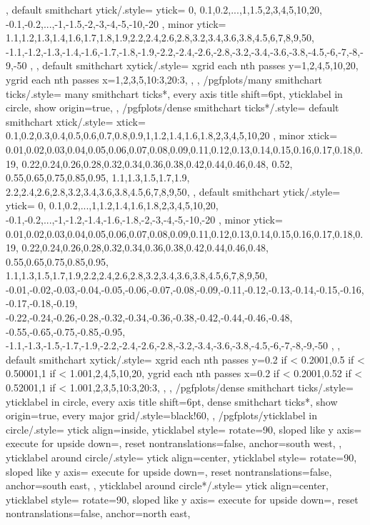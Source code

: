 {{{		},
		default smithchart ytick/.style={
			ytick={%
				0,%
				0.1,0.2,...,1,1.5,2,3,4,5,10,20,%
				-0.1,-0.2,...,-1,-1.5,-2,-3,-4,-5,-10,-20%
			},
			minor ytick={%
				1.1,1.2,1.3,1.4,1.6,1.7,1.8,1.9,2.2,2.4,2.6,2.8,3.2,3.4,3.6,3.8,4.5,6,7,8,9,50,%
				-1.1,-1.2,-1.3,-1.4,-1.6,-1.7,-1.8,-1.9,-2.2,-2.4,-2.6,-2.8,-3.2,-3.4,-3.6,-3.8,-4.5,-6,-7,-8,-9,-50%
			},
		},
		default smithchart xytick/.style={
			xgrid each nth passes y={1,2,4,5,10,20},
			ygrid each nth passes x={1,2,3,5,10:3,20:3},
		},
	},
	/pgfplots/many smithchart ticks/.style={
		many smithchart ticks*,
		every axis title shift=6pt,
		yticklabel in circle,
		show origin=true,
	},
	/pgfplots/dense smithchart ticks*/.style={
		default smithchart xtick/.style={
			xtick={
				0.1,0.2,0.3,0.4,0.5,0.6,0.7,0.8,0.9,1,1.2,1.4,1.6,1.8,2,3,4,5,10,20%
			},
			minor xtick={%
				0.01,0.02,0.03,0.04,0.05,0.06,0.07,0.08,0.09,0.11,0.12,0.13,0.14,0.15,0.16,0.17,0.18,0.19,%
				0.22,0.24,0.26,0.28,0.32,0.34,0.36,0.38,0.42,0.44,0.46,0.48,%
				0.52,%
				0.55,0.65,0.75,0.85,0.95,%
				1.1,1.3,1.5,1.7,1.9,%
				2.2,2.4,2.6,2.8,3.2,3.4,3.6,3.8,4.5,6,7,8,9,50},
		},
		default smithchart ytick/.style={
			ytick={%
				0,%
				0.1,0.2,...,1,1.2,1.4,1.6,1.8,2,3,4,5,10,20,%
				-0.1,-0.2,...,-1,-1.2,-1.4,-1.6,-1.8,-2,-3,-4,-5,-10,-20%
			},
			minor ytick={%
				0.01,0.02,0.03,0.04,0.05,0.06,0.07,0.08,0.09,0.11,0.12,0.13,0.14,0.15,0.16,0.17,0.18,0.19,%
				0.22,0.24,0.26,0.28,0.32,0.34,0.36,0.38,0.42,0.44,0.46,0.48,%
				0.55,0.65,0.75,0.85,0.95,%
				1.1,1.3,1.5,1.7,1.9,2.2,2.4,2.6,2.8,3.2,3.4,3.6,3.8,4.5,6,7,8,9,50,%
				-0.01,-0.02,-0.03,-0.04,-0.05,-0.06,-0.07,-0.08,-0.09,-0.11,-0.12,-0.13,-0.14,-0.15,-0.16,-0.17,-0.18,-0.19,%
				-0.22,-0.24,-0.26,-0.28,-0.32,-0.34,-0.36,-0.38,-0.42,-0.44,-0.46,-0.48,%
				-0.55,-0.65,-0.75,-0.85,-0.95,%
				-1.1,-1.3,-1.5,-1.7,-1.9,-2.2,-2.4,-2.6,-2.8,-3.2,-3.4,-3.6,-3.8,-4.5,-6,-7,-8,-9,-50%
			},
		},
		default smithchart xytick/.style={
			xgrid each nth passes y={0.2 if < 0.2001,0.5 if < 0.50001,1 if < 1.001,2,4,5,10,20},
			ygrid each nth passes x={0.2 if < 0.2001,0.52 if < 0.52001,1 if < 1.001,2,3,5,10:3,20:3},
		},
	},
	/pgfplots/dense smithchart ticks/.style={
		yticklabel in circle,
		every axis title shift=6pt,
		dense smithchart ticks*,
		show origin=true,
		every major grid/.style={black!60},
	},
	/pgfplots/yticklabel in circle/.style={
		ytick align=inside,
		yticklabel style={
			rotate=90,
			sloped like y axis={%
				execute for upside down={\tikzset{anchor=north east}},
				reset nontranslations=false},
			anchor=south west,
		}
	},
	yticklabel around circle/.style={
		ytick align=center,
		yticklabel style={
			rotate=90,
			sloped like y axis={%
				execute for upside down={\tikzset{anchor=south west}},
				reset nontranslations=false},
			anchor=south east,
		}
	},
	yticklabel around circle*/.style={
		ytick align=center,
		yticklabel style={
			rotate=90,
			sloped like y axis={%
				execute for upside down={\tikzset{anchor=north west}},
				reset nontranslations=false},
			anchor=north east,
		}
	}
}

